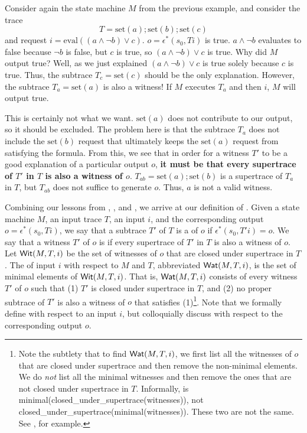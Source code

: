 \begin{example}
  \newcommand{\Mset}{\text{set}}
  \newcommand{\Meval}{\text{eval}}
  Consider again the state machine $M$ from the previous example, and consider
  the trace
  \[
    T = \Mset(a); \Mset(b); \Mset(c)
  \]
  and request $i = \Meval((a \land \lnot b) \lor c)$. $o = \epsilon^*(s_0, Ti)$
  is true. $a \land \lnot b$ evaluates to false because $\lnot b$ is false, but
  $c$ is true, so $(a \land \lnot b) \lor c$ is true.
  Why did $M$ output true? Well, as we just explained $(a \land \lnot b) \lor
  c$ is true solely because $c$ is true. Thus, the subtrace $T_c = \Mset(c)$
  should be the only explanation. However, the subtrace $T_a = \Mset(a)$ is
  also a witness! If $M$ executes $T_a$ and then $i$, $M$ will output true.

  This is certainly not what we want. $\Mset(a)$ does not contribute to our
  output, so it should be excluded. The problem here is that the subtrace $T_a$
  does not include the $\Mset(b)$ request that ultimately keeps the $\Mset(a)$
  request from satisfying the formula. From this, we see that in order for a
  witness $T'$ to be a good explanation of a particular output $o$, \textbf{it
    must be that every supertrace of $T'$ in $T$ is also a witness of $o$}.
    $T_{ab} = \Mset(a); \Mset(b)$ is a supertrace of $T_a$ in $T$, but $T_{ab}$
    does not suffice to generate $o$. Thus, $a$ is not a valid witness.
\end{example}

Combining our lessons from ,
, and , we arrive
at our definition of \watprovenance{}. Given a state machine $M$, an input
trace $T$, an input $i$, and the corresponding output $o = \epsilon^*(s_0,
Ti)$, we say that a subtrace $T'$ of $T$ is a  of $o$ if
$\epsilon^*(s_0, T'i) = o$. We say that a witness $T'$ of $o$ is
 if every supertrace of $T'$ in $T$ is
also a witness of $o$. Let $\textsf{Wit}(M, T, i)$ be the set of witnesses of $o$ that
are closed under supertrace in $T$. The  of input $i$
with respect to $M$ and $T$, abbreviated $\textsf{Wat}(M, T, i)$, is the set of minimal
elements of $\textsf{Wit}(M, T, i)$. That is, $\textsf{Wat}(M, T, i)$ consists of every witness
$T'$ of $o$ such that (1) $T'$ is closed under supertrace in $T$, and (2) no
proper subtrace of $T'$ is also a witness of $o$ that satisfies (1)\footnote{%
  Note the subtlety that to find $\textsf{Wat}(M, T, i)$, we first list all the
  witnesses of $o$ that are closed under supertrace and then remove the
  non-minimal elements. We do \emph{not} list all the minimal witnesses and
  then remove the ones that are not closed under supertrace in $T$.
  Informally, \watprovenance{} is
  minimal(closed\_under\_supertrace(witnesses)), not
  closed\_under\_supertrace(minimal(witnesses)). These two are not the same.
  See , for example.
}. Note that we formally define \watprovenance{} with respect to an input $i$,
but colloquially discuss \watprovenance{} with respect to the corresponding
output $o$.


